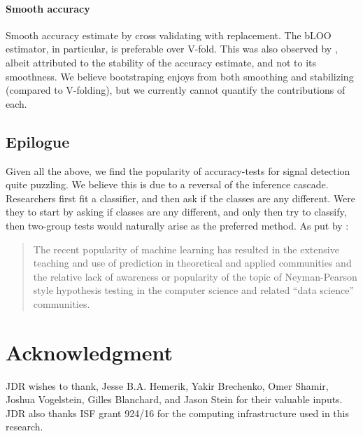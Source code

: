 \documentclass[]{bio}
\begin{document}
\paragraph{Smooth accuracy}
Smooth accuracy estimate by cross validating with replacement. 
The bLOO estimator, in particular, is preferable over V-fold.
This was also observed by \cite{yu2007two}, albeit attributed to the stability of the accuracy estimate, and not to its smoothness. 
We believe bootstraping enjoys from both smoothing and stabilizing (compared to V-folding), but we currently cannot quantify the contributions of each. 





\subsection{Epilogue}
Given all the above, we find the popularity of accuracy-tests for signal detection quite puzzling. 
We believe this is due to a reversal of the inference cascade. 
Researchers first fit a classifier, and then ask if the classes are any different.
Were they to start by asking if classes are any different, and only then try to classify, then two-group tests would naturally arise as the preferred method. 
As put by \cite{ramdas_classification_2016}:
\begin{quote}
	The recent popularity of machine learning has resulted in the extensive teaching and use
	of prediction in theoretical and applied communities and the relative lack of awareness or
	popularity of the topic of Neyman-Pearson style hypothesis testing in the computer science
	and related ``data science'' communities.
\end{quote}




\section*{Acknowledgment}
JDR wishes to thank, Jesse B.A. Hemerik, Yakir Brechenko, Omer Shamir, Joshua Vogelstein, Gilles Blanchard, and Jason Stein for their valuable inputs. 
JDR also thanks ISF grant 924/16 for the computing infrastructure used in this research. 


\newpage


\end{document}
